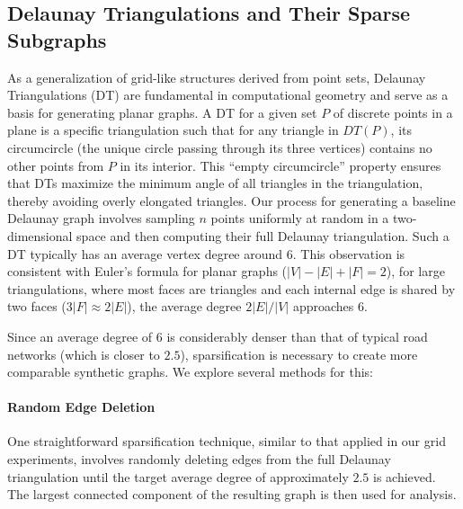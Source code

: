 















\subsection{Delaunay Triangulations and Their Sparse Subgraphs}
\label{sec:synthetic:delaunay_variants}

As a generalization of grid-like structures derived from point sets, Delaunay Triangulations (DT) are fundamental in computational geometry and serve as a basis for generating planar graphs.
A DT for a given set \(P\) of discrete points in a plane is a specific triangulation such that for any triangle in \(DT(P)\), its circumcircle (the unique circle passing through its three vertices) contains no other points from \(P\) in its interior.
This \enquote{empty circumcircle} property ensures that DTs maximize the minimum angle of all triangles in the triangulation, thereby avoiding overly elongated triangles.
Our process for generating a baseline Delaunay graph involves sampling \(n\) points uniformly at random in a two-dimensional space and then computing their full Delaunay triangulation.
Such a DT typically has an average vertex degree around 6. This observation is consistent with Euler's formula for planar graphs (\(|V| - |E| + |F| = 2\)),
for large triangulations, where most faces are triangles and each internal edge is shared by two faces (\(3|F| \approx 2|E|\)), the average degree \(2|E|/|V|\) approaches 6.

Since an average degree of 6 is considerably denser than that of typical road networks (which is closer to \(2.5\)), sparsification is necessary to create more comparable synthetic graphs.
We explore several methods for this:

\paragraph{Random Edge Deletion}

One straightforward sparsification technique, similar to that applied in our grid experiments, involves randomly deleting edges from the full Delaunay triangulation until the target average degree of approximately \(2.5\) is achieved.
The largest connected component of the resulting graph is then used for analysis.

